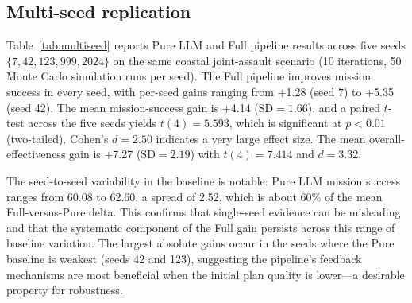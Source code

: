 \FloatBarrier
\subsection{Multi-seed replication}

Table~\ref{tab:multiseed} reports Pure LLM and Full pipeline results across five seeds $\{7, 42, 123, 999, 2024\}$ on the same coastal joint-assault scenario (10 iterations, 50 Monte Carlo simulation runs per seed). The Full pipeline improves mission success in every seed, with per-seed gains ranging from +1.28 (seed 7) to +5.35 (seed 42). The mean mission-success gain is +4.14 ($\text{SD}=1.66$), and a paired $t$-test across the five seeds yields $t(4)=5.593$, which is significant at $p<0.01$ (two-tailed). Cohen's $d=2.50$ indicates a very large effect size. The mean overall-effectiveness gain is +7.27 ($\text{SD}=2.19$) with $t(4)=7.414$ and $d=3.32$.

The seed-to-seed variability in the baseline is notable: Pure LLM mission success ranges from 60.08 to 62.60, a spread of 2.52, which is about 60\% of the mean Full-versus-Pure delta. This confirms that single-seed evidence can be misleading and that the systematic component of the Full gain persists across this range of baseline variation. The largest absolute gains occur in the seeds where the Pure baseline is weakest (seeds 42 and 123), suggesting the pipeline's feedback mechanisms are most beneficial when the initial plan quality is lower---a desirable property for robustness.

